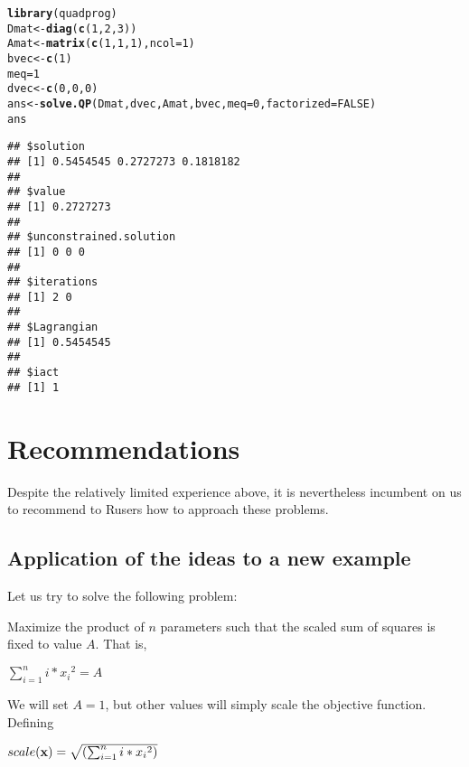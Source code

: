 \documentclass[11pt]{article}\usepackage[]{graphicx}\usepackage[]{color}
\makeatletter
\newcommand{\hlnum}[1]{\textcolor[rgb]{0.686,0.059,0.569}{#1}}%
\newcommand{\hlstd}[1]{\textcolor[rgb]{0.345,0.345,0.345}{#1}}%
\newcommand{\hlkwb}[1]{\textcolor[rgb]{0.69,0.353,0.396}{#1}}%
\newcommand{\hlkwc}[1]{\textcolor[rgb]{0.333,0.667,0.333}{#1}}%
\newcommand{\hlkwd}[1]{\textcolor[rgb]{0.737,0.353,0.396}{\textbf{#1}}}%
\newenvironment{kframe}{%
 \def\at@end@of@kframe{}%
 \ifinner\ifhmode%
  \def\at@end@of@kframe{\end{minipage}}%
  \begin{minipage}{\columnwidth}%
 \fi\fi%
 \def\FrameCommand##1{\hskip\@totalleftmargin \hskip-\fboxsep
 \colorbox{shadecolor}{##1}\hskip-\fboxsep
     \hskip-\linewidth \hskip-\@totalleftmargin \hskip\columnwidth}%
 \MakeFramed {\advance\hsize-\width
   \@totalleftmargin\z@ \linewidth\hsize
   \@setminipage}}%
 {\par\unskip\endMakeFramed%
 \at@end@of@kframe}
\newenvironment{knitrout}{}{} %
\newcommand{\B}[1]{{\bf #1 \rm}}
\newcommand{\R}{{\sf R}}
\makeatother
\begin{document}
\begin{knitrout}\scriptsize
{}\color{fgcolor}\begin{kframe}
\begin{alltt}
\hlkwd{library}\hlstd{(quadprog)}
\hlstd{Dmat}\hlkwb{<-}\hlkwd{diag}\hlstd{(}\hlkwd{c}\hlstd{(}\hlnum{1}\hlstd{,}\hlnum{2}\hlstd{,}\hlnum{3}\hlstd{))}
\hlstd{Amat}\hlkwb{<-}\hlkwd{matrix}\hlstd{(}\hlkwd{c}\hlstd{(}\hlnum{1}\hlstd{,} \hlnum{1}\hlstd{,} \hlnum{1}\hlstd{),} \hlkwc{ncol}\hlstd{=}\hlnum{1}\hlstd{)}
\hlstd{bvec}\hlkwb{<-}\hlkwd{c}\hlstd{(}\hlnum{1}\hlstd{)}
\hlstd{meq}\hlkwb{=}\hlnum{1}
\hlstd{dvec}\hlkwb{<-}\hlkwd{c}\hlstd{(}\hlnum{0}\hlstd{,} \hlnum{0}\hlstd{,} \hlnum{0}\hlstd{)}
\hlstd{ans}\hlkwb{<-}\hlkwd{solve.QP}\hlstd{(Dmat, dvec, Amat, bvec,} \hlkwc{meq}\hlstd{=}\hlnum{0}\hlstd{,} \hlkwc{factorized}\hlstd{=}\hlnum{FALSE}\hlstd{)}
\hlstd{ans}
\end{alltt}
\begin{verbatim}
## $solution
## [1] 0.5454545 0.2727273 0.1818182
## 
## $value
## [1] 0.2727273
## 
## $unconstrained.solution
## [1] 0 0 0
## 
## $iterations
## [1] 2 0
## 
## $Lagrangian
## [1] 0.5454545
## 
## $iact
## [1] 1
\end{verbatim}
\end{kframe}
\end{knitrout}

\section{Recommendations}

Despite the relatively limited experience above, it is nevertheless incumbent on us to 
recommend to \R users how to approach these problems. 

\subsection{Application of the ideas to a new example}

Let us try to solve the following problem:

Maximize the product of $n$ parameters such that the scaled sum of squares is fixed to value $A$.
That is, 

$\sum_{i=1}^n{i*{x_i}^2} = A $

We will set $A = 1$, but other values will simply scale the objective function.
Defining 

$ scale({\B{x})} = \sqrt{(\sum_{i=1}^n{i*{x_i}^2})}  $
\end{document}
